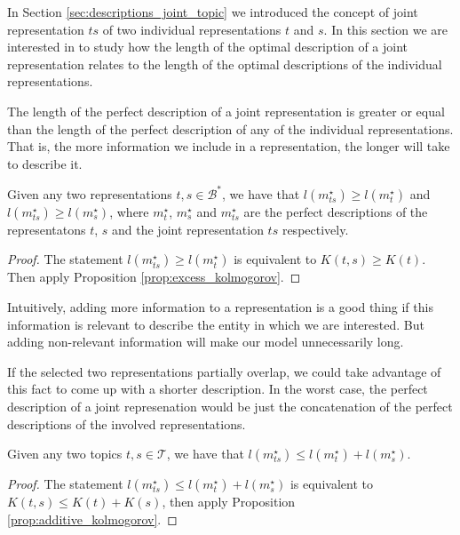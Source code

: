 In Section \ref{sec:descriptions_joint_topic} we introduced the concept of joint representation $ts$ of two individual representations $t$ and $s$. In this section we are interested in to study how the length of the optimal description of a joint representation relates to the length of the optimal descriptions of the individual representations.

The length of the perfect description of a joint representation is greater or equal than the length of the perfect description of any of the individual representations. That is, the more information we include in a representation, the longer will take to describe it. 

\begin{proposition}
\label{prop:joint_length}
Given any two representations $t,s \in \mathcal{B}^\ast$, we have that $l \left( m_{ts}^{\star} \right) \geq l \left( m_{t}^{\star} \right)$ and $l \left( m_{ts}^{\star} \right) \geq l \left( m_{s}^{\star} \right)$, where $m_{t}^{\star}$, $m_{s}^{\star}$ and $m_{ts}^{\star}$ are the perfect descriptions of the representatons $t$, $s$ and the joint representation $ts$ respectively.
\end{proposition}
\begin{proof}
The statement $l \left( m_{ts}^{\star} \right) \geq l \left( m_{t}^{\star} \right)$ is equivalent to $K(t,s) \geq K(t)$. Then apply Proposition \ref{prop:excess_kolmogorov}.
\end{proof}

Intuitively, adding more information to a representation is a good thing if this information is relevant to describe the entity in which we are interested. But adding non-relevant information will make our model unnecessarily long.

If the selected two representations partially overlap, we could take advantage of this fact to come up with a shorter description. In the worst case, the perfect description of a joint represenation would be just the concatenation of the perfect descriptions of the involved representations.

\begin{proposition}
\label{prop:joint_sum}
Given any two topics $t,s \in \mathcal{T}$, we have that $l \left( m_{ts}^{\star} \right) \leq l \left( m_{t}^{\star} \right) + l \left( m_{s}^{\star} \right)$.
\end{proposition}
\begin{proof}
The statement $l \left( m_{ts}^{\star} \right) \leq l \left( m_{t}^{\star} \right) + l \left( m_{s}^{\star} \right)$ is equivalent to $K(t,s) \leq K(t) + K(s)$, then apply Proposition \ref{prop:additive_kolmogorov}.
\end{proof}

